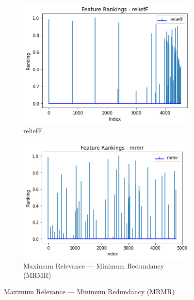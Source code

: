 \documentclass{article}
\begin{document}
\begin{figure}[htb]
  \centering
  \begin{subfigure}[b]{\linewidth}
    \includegraphics[width=1\linewidth]{fish_rankings_k-50_reliefF.png}
    \caption{reliefF}
    \label{fig:fish-rankings-reliefF}
  \end{subfigure}

  \begin{subfigure}[b]{\linewidth}
    \includegraphics[width=1\linewidth]{fish_rankings_k-50_mrmr.png}
    \caption{Maximum Relevance — Minimum Redundancy (MRMR)}
    \label{fig:fish-rankings-mrmr}
  \end{subfigure}


\end{figure}
\end{document}
